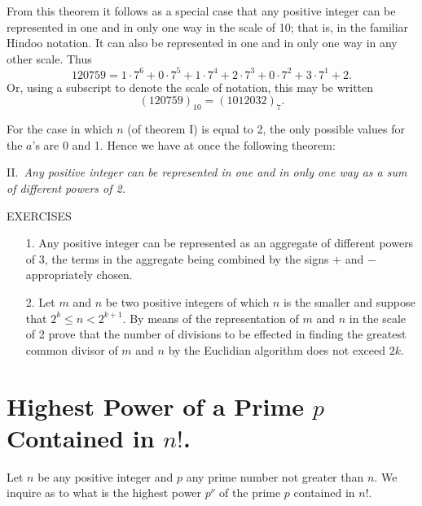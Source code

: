 \documentclass[oneside]{book}
\begin{document}
From this theorem it follows as a special case that any positive
integer can be represented in one and in only one way in the scale
of 10; that is, in the familiar Hindoo notation. It can also be
represented in one and in only one way in any other scale. Thus
\begin{equation*}
120759 = 1 \cdot 7^6 + 0 \cdot 7^5 + 1 \cdot 7^4 + 2 \cdot 7^3 +
   0 \cdot 7^2 + 3 \cdot 7^1 + 2.
\end{equation*}
Or, using a subscript to denote the scale of notation, this may be
written
\begin{equation*}
(120759)_{10} = (1012032)_7.
\end{equation*}

For the case in which $n$ (of theorem I) is equal to 2, the only
possible values for the $a$'s are 0 and 1. Hence we have at once the
following theorem:

II.~\emph{Any positive integer can be represented in one and in only
one way as a sum of different powers of 2.}

\newpage
\begin{center}
EXERCISES
\end{center}

\small \begin{enumerate}

\item[1.] Any positive integer can be represented as an aggregate of
different powers of $3$, the terms in the aggregate being combined
by the signs $+$ and $-$ appropriately chosen.

\item[2.] Let $m$ and $n$ be two positive integers of which $n$ is the
smaller and suppose that $2^k \leq n < 2^{k+1}$. By means of the
representation of $m$ and $n$ in the scale of 2 prove that the
number of divisions to be effected in finding the greatest common
divisor of $m$ and $n$ by the Euclidian algorithm does not exceed
$2k$.
\end{enumerate}\normalsize{}

\section{Highest Power of a Prime $p$ Contained in $n!$.}\label{s12}%

Let $n$ be any positive integer and $p$ any prime number not greater
than $n$. We inquire as to what is the highest power $p^\nu$ of the
prime $p$ contained in $n!$.
\end{document}
